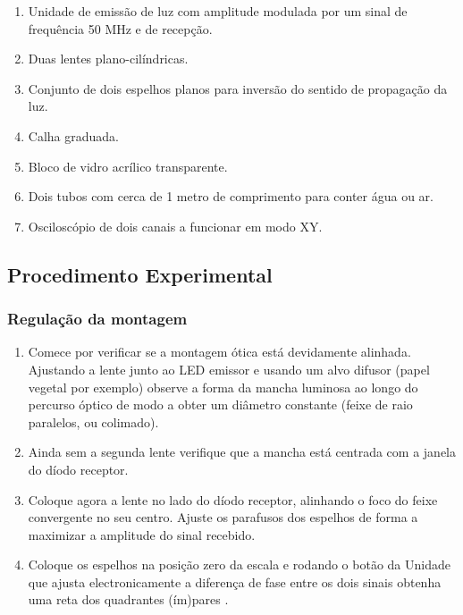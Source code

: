 \documentclass[a4paper,12pt]{article}      %
\begin{document}
\begin{enumerate}
\setlength{\itemsep}{0mm}
\item Unidade de emissão de luz  com amplitude modulada por um sinal de frequência 50 MHz e de recepção.
\item Duas lentes plano-cilíndricas.
\item Conjunto de dois espelhos planos para inversão do sentido de propagação da luz.
\item Calha graduada.  
\item Bloco de vidro acrílico transparente.
\item Dois tubos com cerca de 1 metro de comprimento para conter água ou ar. 
\item Osciloscópio de dois canais a funcionar em modo XY.
\end{enumerate}

\subsection{\sf Procedimento Experimental}
\subsubsection{\sf Regulação da montagem}
 
\begin{enumerate}
\setlength{\itemsep}{0mm}
\item Comece por verificar se a montagem ótica está devidamente alinhada. Ajustando a lente junto ao LED emissor e usando um alvo difusor (papel vegetal por exemplo) observe a forma da mancha 
luminosa ao longo do percurso óptico  de modo a obter um diâmetro constante (feixe de raio paralelos, ou colimado). 
\item Ainda sem a segunda lente verifique que a mancha está centrada com  a janela do 
díodo receptor. 
\item Coloque agora a lente no lado do díodo receptor, alinhando o foco do feixe convergente no seu centro. 
Ajuste os parafusos dos espelhos de forma a maximizar a amplitude do sinal 
recebido.
\item Coloque os espelhos na posição zero da escala e rodando o botão da Unidade que ajusta electronicamente a diferença de fase entre os dois sinais obtenha uma reta dos quadrantes (ím)pares . 
\end{enumerate}
\end{document}
